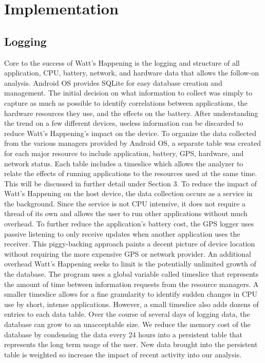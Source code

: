 \section*{Implementation}
\subsection*{Logging}
Core to the success of Watt's Happening is the logging and structure of all application, CPU, battery, network, and hardware data that allows the follow-on analysis.  
Android OS provides SQLite for easy database creation and management. 
The initial decision on what information to collect was simply to capture as much as possible to identify correlations between applications, the hardware resources they use, and the effects on the battery.  
After understanding the trend on a few different devices, useless information can be discarded to reduce Watt's Happening's impact on the device.
To organize the data collected from the various managers provided by Android OS, a separate table was created for each major resource to include application, battery, GPS, hardware, and network status.  
Each table includes a timeslice which allows the analyzer to relate the effects of running applications to the resources used at the same time.  
This will be discussed in further detail under Section 3.
To reduce the impact of Watt's Happening on the host device, the data collection occurs as a service in the background.  
Since the service is not CPU intensive, it does not require a thread of its own and allows 
the user to run other applications without much overhead.  
To further reduce the application's battery cost, the GPS logger uses passive listening to only receive updates when another application uses the receiver.  
This piggy-backing approach paints a decent picture of device location without requiring the more expensive GPS or network provider.
An additional overhead Watt's Happening seeks to limit is the potentially unlimited growth of the database.  
The program uses a global variable called timeslice that represents the amount of time between information requests from the resource managers.  
A smaller timeslice allows for a fine granularity to identify sudden changes in CPU use by short, intense applications.  
However, a small timeslice also adds dozens of entries to each data table. 
 Over the course of several days of logging data, the database can grow to an unacceptable size.  
We reduce the memory cost of the database by condensing the data every 24 hours into a persistent table that represents the long term usage of the user.  
New data brought into the persistent table is weighted so increase the impact of recent activity into our analysis.
